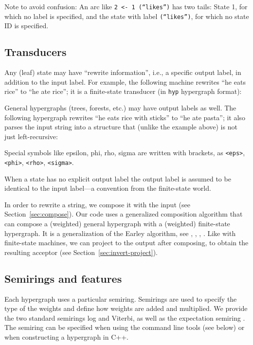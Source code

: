 \documentclass[12pt]{article}
\newcommand{\yellowlisting}[1]{%
  }
\newcommand{\hyp}{\texttt{hyp}\xspace}
\newcommand{\code}[1]{\texttt{#1}}
\newcommand{\secref}[1]{Section~\ref{sec:#1}}
\let\cite\citep    %
\begin{document}
Note to avoid confusion: An arc like \code{2 <- 1 (``likes'')} has two
tails: State 1, for which no label is specified, and the state with
label \code{(``likes'')}, for which no state ID is specified.

\subsection{Transducers}

Any (leaf) state may have ``rewrite information'', i.e., a specific
output label, in addition to the input label. For example, the
following machine rewrites ``he eats rice'' to ``he ate rice''; it is
a finite-state transducer (in \hyp hypergraph format):
\yellowlisting{fig/fst.hyp}

General hypergraphs (trees, forests, etc.) may have output
labels as well. The following hypergraph rewrites ``he eats rice with
sticks'' to ``he ate pasta''; it also parses the input string into a
structure that (unlike the example above) is not just left-recursive:
\yellowlisting{fig/tree_transduce.hyp}

Special symbols like epsilon, phi, rho, sigma are written with
brackets, as \code{<eps>}, \code{<phi>}, \code{<rho>}, \code{<sigma>}.

When a state has no explicit output label the output label is assumed
to be identical to the input label---a convention from the finite-state
world.

In order to rewrite a string, we compose it with the input (see
\secref{compose}). Our code uses a generalized composition algorithm
that can compose a (weighted) general hypergraph with a (weighted)
finite-state hypergraph. It is a generalization of the Earley
algorithm, see \cite{earley_efficient_1970},
\cite{stolcke_efficient_1995}, \cite{ eisner_compiling_2005},
\cite{dyer_formal_2010}. Like with finite-state machines, we can
project to the output after composing, to obtain the resulting
acceptor (see \secref{invert-project}).

\subsection{Semirings and features}\label{sec:semirings}

Each hypergraph uses a particular semiring. Semirings are used to
specify the type of the weights and define how weights are added and
multiplied.  We provide the two standard semirings log and Viterbi, as
well as the expectation semiring \cite{eisner-2002-acl-fst}. The
semiring can be specified when using the command line tools (see
below) or when constructing a hypergraph in C++.
\end{document}
